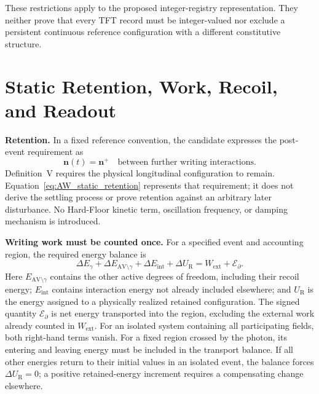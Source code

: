 These restrictions apply to the proposed integer-registry representation. They neither prove that every TFT record must be integer-valued nor exclude a persistent continuous reference configuration with a different constitutive structure.

\section{Static Retention, Work, Recoil, and Readout}
\label{sec:AW_physical_closure}

\noindent\textbf{Retention.}
In a fixed reference convention, the candidate expresses the post-event requirement as
\begin{equation}
    \mathbf n(t)=\mathbf n^{+}
    \quad\text{between further writing interactions}.
    \label{eq:AW_static_retention}
\end{equation}
Definition~V requires the physical longitudinal configuration to remain. Equation~\eqref{eq:AW_static_retention} represents that requirement; it does not derive the settling process or prove retention against an arbitrary later disturbance. No Hard-Floor kinetic term, oscillation frequency, or damping mechanism is introduced.

\medskip
\noindent\textbf{Writing work must be counted once.}
For a specified event and accounting region, the required energy balance is
\begin{equation}
    \Delta E_\gamma
    +\Delta E_{\mathrm{AV}\setminus\gamma}
    +\Delta E_{\mathrm{int}}
    +\Delta U_{\mathrm R}
    =W_{\mathrm{ext}}+\mathcal E_{\partial}.
    \label{eq:AW_energy_ledger}
\end{equation}
Here $E_{\mathrm{AV}\setminus\gamma}$ contains the other active degrees of freedom, including their recoil energy; $E_{\mathrm{int}}$ contains interaction energy not already included elsewhere; and $U_{\mathrm R}$ is the energy assigned to a physically realized retained configuration. The signed quantity $\mathcal E_{\partial}$ is net energy transported into the region, excluding the external work already counted in $W_{\mathrm{ext}}$. For an isolated system containing all participating fields, both right-hand terms vanish. For a fixed region crossed by the photon, its entering and leaving energy must be included in the transport balance. If all other energies return to their initial values in an isolated event, the balance forces $\Delta U_{\mathrm R}=0$; a positive retained-energy increment requires a compensating change elsewhere.

